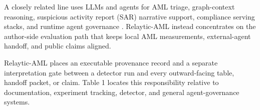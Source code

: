 \documentclass[11pt]{article}
\begin{document}
A closely related line uses LLMs and agents for AML triage, graph-context reasoning, suspicious activity report (SAR) narrative support, compliance serving stacks, and runtime agent governance \citep{pirmorad2025amlgraphllm,naik2025coinvestigator,naik2026llmopsaml,gaurav2025governanceaas,kaptein2026runtimegovernance}. Relaytic-AML instead concentrates on the author-side evaluation path that keeps local AML measurements, external-agent handoff, and public claims aligned.

Relaytic-AML places an executable provenance record and a separate interpretation gate between a detector run and every outward-facing table, handoff packet, or claim. Table 1 locates this responsibility relative to documentation, experiment tracking, detector, and general agent-governance systems.

\end{document}
